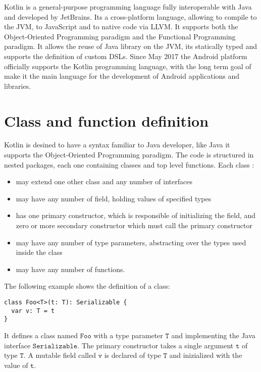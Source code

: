 Kotlin \cite{Kotlin} is a general-purpose programming language fully interoperable with Java and developed by JetBrains. Its a cross-platform language, allowing to compile to the JVM, to JavaScript and to native code via LLVM. It supports both the Object-Oriented Programming paradigm and the Functional Programming paradigm. It allows the reuse of Java library on the JVM, its statically typed and supports the definition of custom DSLs. Since May 2017 the Android platform officially supports the Kotlin programming language, with the long term goal of make it the main language for the development of Android applications and libraries.

\section{Class and function definition}

Kotlin is desined to have a syntax familiar to Java developer, like Java it supports the Object-Oriented Programming paradigm. The code is structured in nested packages, each one containing classes and top level functions. Each class :
\begin{itemize}
\item may extend one other class and any number of interfaces
\item may have any number of field, holding values of specified types
\item has one primary constructor, which is responsible of initializing the field, and zero or more secondary constructor which must call the primary constructor
\item may have any number of type parameters, abstracting over the types used inside the class
\item may have any number of functions.
\end{itemize}

The following example shows the definition of a class:
\begin{lstlisting}[language={kotac}]
class Foo<T>(t: T): Serializable {
  var v: T = t
}
\end{lstlisting}
It defines a class named $\mathtt{Foo}$ with a type parameter $\mathtt{T}$ and implementing the Java interface $\mathtt{Serializable}$. The primary constructor takes a single argument $\mathtt{t}$ of type $\mathtt{T}$. A mutable field called $\mathtt{v}$ is declared of type $\mathtt{T}$ and inizialized with the value of $\mathtt{t}$.

